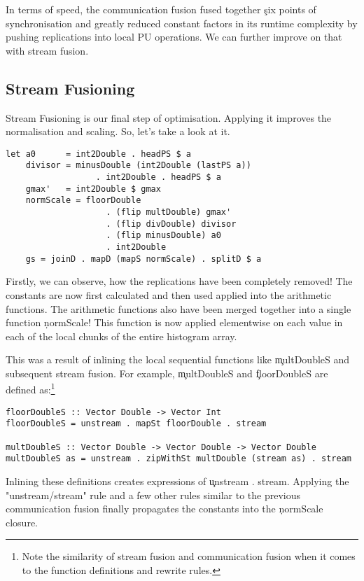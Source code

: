       
      In terms of speed, the communication fusion fused together \c{six} points of synchronisation
      and greatly reduced constant factors in its runtime complexity by pushing
      replications into local PU operations. We can further improve on that with stream fusion.
      
    \subsection{Stream Fusioning}
      Stream Fusioning is our final step of optimisation. Applying it improves
      the normalisation and scaling. So, let's take a look at it.
      \begin{lstlisting}
let a0      = int2Double . headPS $ a 
    divisor = minusDouble (int2Double (lastPS a))
                  . int2Double . headPS $ a
    gmax'   = int2Double $ gmax
    normScale = floorDouble
                    . (flip multDouble) gmax'
                    . (flip divDouble) divisor
                    . (flip minusDouble) a0
                    . int2Double
    gs = joinD . mapD (mapS normScale) . splitD $ a
       \end{lstlisting}
       Firstly, we can observe, how the replications have been completely removed! The
       constants are now first calculated and then used applied into the
       arithmetic functions. The arithmetic functions also have been merged together into
       a single function \c{normScale}! This function is now applied elementwise
       on each value in each of the local chunks of the entire histogram array.
       
       This was a result of inlining the local sequential functions like \c{multDoubleS}
       and subsequent stream fusion. For example, \c{multDoubleS} and \c{floorDoubleS} are defined as:\footnote[1]{Note the similarity of stream fusion and communication fusion when it comes to the function definitions and rewrite rules.}
       \begin{lstlisting}
floorDoubleS :: Vector Double -> Vector Int
floorDoubleS = unstream . mapSt floorDouble . stream

multDoubleS :: Vector Double -> Vector Double -> Vector Double
multDoubleS as = unstream . zipWithSt multDouble (stream as) . stream
       \end{lstlisting}
       Inlining these definitions creates expressions of \c{unstream . stream}. Applying
       the "unstream/stream" rule and a few other rules similar to the previous
       communication fusion finally propagates the constants into the
       \c{normScale} closure.
       
